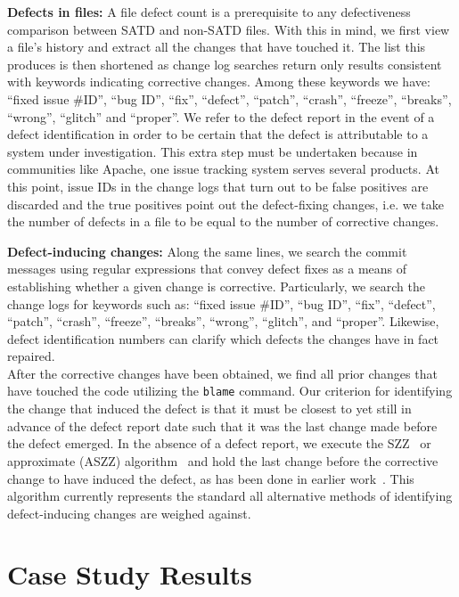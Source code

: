 \noindent\textbf{Defects in files:}
A file defect count is a prerequisite to any defectiveness comparison between SATD and non-SATD files. With this in mind, we first view a file's history and extract all the changes that have touched it. The list this produces is then shortened as change log searches return only results consistent with keywords indicating corrective changes. Among these keywords we have: ``fixed issue \#ID'', ``bug ID'',  ``fix'',  ``defect'',  ``patch'', ``crash'',  ``freeze'', ``breaks'', ``wrong'', ``glitch'' and ``proper''. We refer to the defect report in the event of a defect identification in order to be certain that the defect is attributable to a system under investigation. This extra step must be undertaken because in communities like Apache, one issue tracking system serves several products.  At this point, issue IDs in the change logs that turn out to be false positives are discarded and the true positives point out the defect-fixing changes, i.e. we take the number of defects in a file to be equal to the number of corrective changes.

\noindent \textbf{Defect-inducing changes:}
Along the same lines, we search the commit messages using regular expressions that convey defect fixes as a means of establishing whether a given change is corrective. Particularly, we search the change logs for keywords such as: ``fixed issue \#ID'', ``bug ID'',  ``fix'',  ``defect'',  ``patch'', ``crash'',  ``freeze'', ``breaks'', ``wrong'', ``glitch'', and ``proper''. Likewise, defect identification numbers can clarify which defects the changes have in fact repaired.\\

After the corrective changes have been obtained, we find all prior changes that have touched the code utilizing the \texttt{blame} command. Our criterion for identifying the change that induced the defect is that it must be closest to yet still in advance of the defect report date such that it was the last change made before the defect emerged. In the absence of a defect report, we execute the SZZ~\cite{sliwerski-msr-2005} or approximate (ASZZ) algorithm~\cite{Kamei-tse-2013} and hold the last change before the corrective change to have induced the defect, as has been done in earlier work~\cite{Kamei-tse-2013}. This algorithm currently represents the standard all alternative methods of identifying defect-inducing changes are weighed against.

\section{Case Study Results}
\label{chap4:sec:case_study_results}

